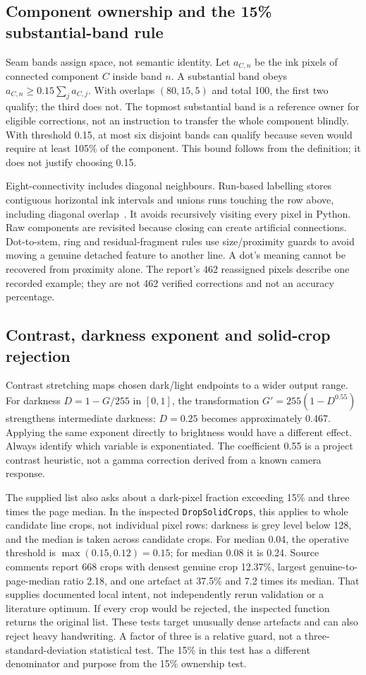 \subsection{Component ownership and the 15\% substantial-band rule}
Seam bands assign space, not semantic identity. Let $a_{C,n}$ be the ink
pixels of connected component $C$ inside band $n$. A substantial band obeys
$a_{C,n}\ge0.15\sum_j a_{C,j}$. With overlaps $(80,15,5)$ and total 100,
the first two qualify; the third does not. The topmost substantial band is
a reference owner for eligible corrections, not an instruction to transfer
the whole component blindly. With threshold 0.15, at most six disjoint bands
can qualify because seven would require at least 105\% of the component.
This bound follows from the definition; it does not justify choosing 0.15.

Eight-connectivity includes diagonal neighbours. Run-based labelling stores
contiguous horizontal ink intervals and unions runs touching the row above,
including diagonal overlap~\cite{he2008,tarjan1975}. It avoids recursively
visiting every pixel in Python. Raw components are revisited because closing
can create artificial connections. Dot-to-stem, ring and residual-fragment
rules use size/proximity guards to avoid moving a genuine detached feature
to another line. A dot's meaning cannot be recovered from proximity alone.
The report's 462 reassigned pixels describe one recorded example; they are
not 462 verified corrections and not an accuracy percentage.

\subsection{Contrast, darkness exponent and solid-crop rejection}
Contrast stretching maps chosen dark/light endpoints to a wider output range.
For darkness $D=1-G/255$ in $[0,1]$, the transformation
$G'=255(1-D^{0.55})$ strengthens intermediate darkness: $D=0.25$ becomes
approximately 0.467. Applying the same exponent directly to brightness
would have a different effect. Always identify which variable is exponentiated.
The coefficient 0.55 is a project contrast heuristic, not a gamma correction
derived from a known camera response.

The supplied list also asks about a dark-pixel fraction exceeding 15\% and
three times the page median. In the inspected \texttt{DropSolidCrops}, this
applies to whole candidate line crops, not individual pixel rows: darkness
is grey level below 128, and the median is taken across candidate crops.
For median
0.04, the operative threshold is $\max(0.15,0.12)=0.15$; for median 0.08
it is 0.24. Source comments report 668 crops with densest genuine crop 12.37\%,
largest genuine-to-page-median ratio 2.18, and one artefact at 37.5\% and
7.2 times its median. That supplies documented local intent, not independently
rerun validation or a literature optimum. If every crop would be rejected,
the inspected function returns the original list. These tests target unusually
dense artefacts and can also reject heavy handwriting. A factor of three is a relative guard, not a
three-standard-deviation statistical test. The 15\% in this test has a
different denominator and purpose from the 15\% ownership test.

